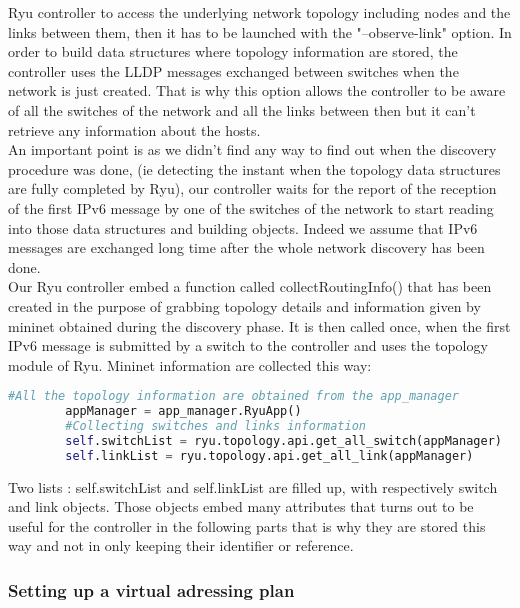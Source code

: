 \documentclass{article}
\begin{document}
Ryu controller to access the underlying network topology including
nodes and the links between them, then it has to be launched with the
"--observe-link" option. In order to build data structures where
topology information are stored, the controller uses the LLDP messages
exchanged between switches when the network is just created. That is
why this option allows the controller to be aware of all the switches
of the network and all the links between then but it can't retrieve
any information about the hosts.\\
\newline
An important point is as we didn't find any way to find out when the
discovery procedure was done, (ie detecting the instant when the
topology data structures are fully completed by Ryu), our controller
waits for the report of the reception of the first IPv6 message by one
of the switches of the network to start reading into those data
structures and building objects. Indeed we assume that IPv6 messages
are exchanged long time after the whole network discovery has been
done.\\
\newline
Our Ryu controller embed a function called collectRoutingInfo() that
has been created in the purpose of grabbing topology details and
information given by mininet obtained during the discovery phase.  It
is then called once, when the first IPv6 message is submitted by a
switch to the controller and uses the topology module of Ryu. Mininet
information are collected this way:

\begin{lstlisting}[frame=single,language=Python] 
         #All the topology information are obtained from the app_manager
        appManager = app_manager.RyuApp()
        #Collecting switches and links information
        self.switchList = ryu.topology.api.get_all_switch(appManager)
        self.linkList = ryu.topology.api.get_all_link(appManager)
\end{lstlisting}

Two lists : self.switchList and self.linkList are filled up, with
respectively switch and link objects. Those objects embed many
attributes that turns out to be useful for the controller in the
following parts that is why they are stored this way and not in only
keeping their identifier or reference.

\subsubsection{Setting up a virtual adressing plan}
\end{document}
